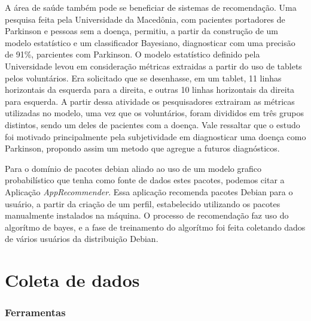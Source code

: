 A área de saúde também pode se beneficiar de sistemas de recomendação. Uma pesquisa feita pela Universidade da Macedônia,  com pacientes portadores de Parkinson e pessoas sem a doença, permitiu, a partir da construção de um modelo estatístico e um classificador Bayesiano, diagnosticar com uma precisão de 91\%, parcientes com Parkinson\cite{Kotsavasiloglou}. O modelo estatístico definido pela Universidade levou em consideração métricas extraidas a partir do uso de tablets pelos voluntários. Era solicitado que se desenhasse, em um tablet, 11 linhas horizontais da esquerda para a direita, e outras 10 linhas horizontais da direita para esquerda. A partir dessa atividade os pesquisadores extrairam as métricas utilizadas no modelo, uma vez que os voluntários, foram divididos em três grupos distintos, sendo um deles de pacientes com a doença. Vale ressaltar que o estudo foi motivado principalmente pela subjetividade em diagnosticar uma doença como Parkinson, propondo assim um metodo que agregue a futuros diagnósticos.

Para o domínio de pacotes debian aliado ao uso de um modelo grafico probabilístico que tenha como fonte de dados estes pacotes, podemos citar a Aplicação \textit{AppRecommender}. Essa aplicação recomenda pacotes Debian para o usuário,
a partir da criação de um perfil, estabelecido utilizando os pacotes manualmente instalados na máquina.
O processo de recomendação faz uso do algorítmo de bayes, e a fase de treinamento do algorítmo foi feita coletando dados de vários usuários da distribuição Debian.

\section{Coleta de dados}

\subsubsection{Ferramentas}
